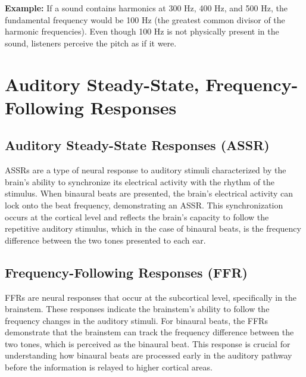 \documentclass{article}
\begin{document}
\textbf{Example:} If a sound contains harmonics at 300 Hz, 400 Hz, and 500 Hz, the fundamental frequency would be 100 Hz (the greatest common divisor of the harmonic frequencies). Even though 100 Hz is not physically present in the sound, listeners perceive the pitch as if it were.


\section{Auditory Steady-State, Frequency-Following Responses}
    
\subsection{Auditory Steady-State Responses (ASSR)}
ASSRs are a type of neural response to auditory stimuli characterized by the brain's ability to synchronize its electrical activity with the rhythm of the stimulus. When binaural beats are presented, the brain's electrical activity can lock onto the beat frequency, demonstrating an ASSR. This synchronization occurs at the cortical level and reflects the brain's capacity to follow the repetitive auditory stimulus, which in the case of binaural beats, is the frequency difference between the two tones presented to each ear.

\subsection{Frequency-Following Responses (FFR)}
FFRs are neural responses that occur at the subcortical level, specifically in the brainstem. These responses indicate the brainstem's ability to follow the frequency changes in the auditory stimuli. For binaural beats, the FFRs demonstrate that the brainstem can track the frequency difference between the two tones, which is perceived as the binaural beat. This response is crucial for understanding how binaural beats are processed early in the auditory pathway before the information is relayed to higher cortical areas.
\end{document}
